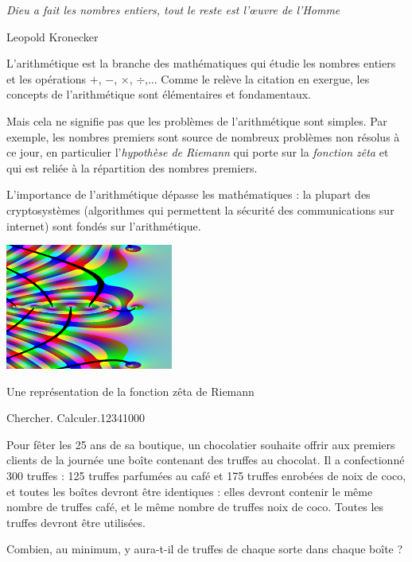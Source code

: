  \begin{His}
   
  \hfill{\em Dieu a fait les nombres entiers, tout le reste est l'œuvre de l'Homme}

  \hfill{Leopold Kronecker}

     \bigskip

     
\begin{minipage}[b]{0.6\textwidth}{L'arithmétique est la branche des mathématiques qui étudie
  les nombres entiers et les opérations $+$, $-$, $\times$, $\div$,...
  Comme le relève la citation en exergue, les concepts de l'arithmétique
  sont élémentaires et fondamentaux.

  Mais cela ne signifie pas que
  les problèmes de l'arithmétique sont simples. Par exemple,
  les nombres premiers sont source de nombreux problèmes
  non résolus à ce jour, en particulier l'{\em hypothèse de Riemann}
  qui porte sur la {\em fonction zêta} et qui est reliée à la
  répartition des nombres premiers.

  L'importance de l'arithmétique dépasse les mathématiques : la plupart des
  cryptosystèmes (algorithmes qui permettent la sécurité des
  communications sur internet) sont fondés sur l'arithmétique.
  }
\end{minipage}
\begin{minipage}[b]{0.4\textwidth}
\begin{center}    
  \includegraphics[width=5.5cm]{FIG/zeta7b.png}

  Une représentation de la fonction zêta de Riemann

\end{center}
\end{minipage}

\end{His}

 

\begin{ExoDec}{Chercher. Calculer.}{1234}{1}{0}{0}{0}

Pour fêter les 25 ans de sa boutique, un chocolatier souhaite offrir aux premiers clients de la journée une boîte contenant des truffes au chocolat.
Il a confectionné 300 truffes : 125 truffes parfumées au café et 175 truffes enrobées de noix de coco, et toutes les boîtes devront être identiques : elles
devront contenir le même nombre de truffes café, et le même nombre
de truffes noix de coco. Toutes les truffes devront être utilisées.

Combien, au minimum,  y aura-t-il de truffes de chaque sorte dans chaque boîte ?
 
\end{ExoDec}

